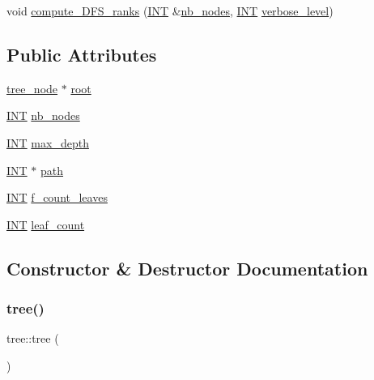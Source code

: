 \begin{DoxyCompactItemize}
\item 
void \mbox{\hyperlink{classtree_acfb648864efbb402a67877d1fd5dfc04}{compute\+\_\+\+D\+F\+S\+\_\+ranks}} (\mbox{\hyperlink{galois_8h_a09fddde158a3a20bd2dcadb609de11dc}{I\+NT}} \&\mbox{\hyperlink{classtree_a1598e622c5d7587f8d3fe4b9318e0156}{nb\+\_\+nodes}}, \mbox{\hyperlink{galois_8h_a09fddde158a3a20bd2dcadb609de11dc}{I\+NT}} \mbox{\hyperlink{simeon_8_c_a818073fbcc2f439e7c56952f67386122}{verbose\+\_\+level}})
\end{DoxyCompactItemize}
\subsection*{Public Attributes}
\begin{DoxyCompactItemize}
\item 
\mbox{\hyperlink{classtree__node}{tree\+\_\+node}} $\ast$ \mbox{\hyperlink{classtree_a8772da48b43717359cbf9fb969e090d0}{root}}
\item 
\mbox{\hyperlink{galois_8h_a09fddde158a3a20bd2dcadb609de11dc}{I\+NT}} \mbox{\hyperlink{classtree_a1598e622c5d7587f8d3fe4b9318e0156}{nb\+\_\+nodes}}
\item 
\mbox{\hyperlink{galois_8h_a09fddde158a3a20bd2dcadb609de11dc}{I\+NT}} \mbox{\hyperlink{classtree_a20f34d31ef80e9265b865ed6800c14ab}{max\+\_\+depth}}
\item 
\mbox{\hyperlink{galois_8h_a09fddde158a3a20bd2dcadb609de11dc}{I\+NT}} $\ast$ \mbox{\hyperlink{classtree_a318299f8ef67bf2ed2a5a9a089a13f1b}{path}}
\item 
\mbox{\hyperlink{galois_8h_a09fddde158a3a20bd2dcadb609de11dc}{I\+NT}} \mbox{\hyperlink{classtree_ac554372c16b36f73ff9177c7f9601d53}{f\+\_\+count\+\_\+leaves}}
\item 
\mbox{\hyperlink{galois_8h_a09fddde158a3a20bd2dcadb609de11dc}{I\+NT}} \mbox{\hyperlink{classtree_a1d57ffbcc2e163959040be4b58db2413}{leaf\+\_\+count}}
\end{DoxyCompactItemize}


\subsection{Constructor \& Destructor Documentation}
\mbox{\label{classtree_a9f2a566ac2710fafc31232456780e82d}} 
\subsubsection{\texorpdfstring{tree()}{tree()}}
{\footnotesize\ttfamily tree\+::tree (\begin{DoxyParamCaption}{ }\end{DoxyParamCaption})}

